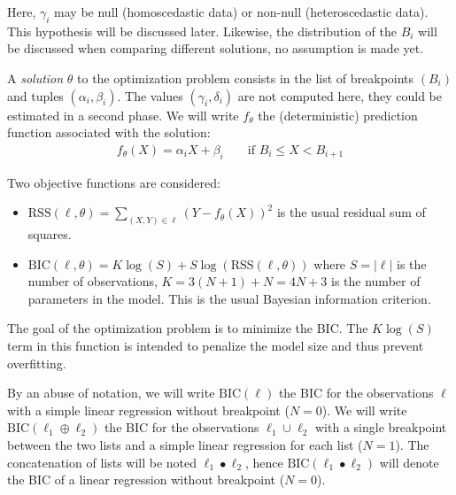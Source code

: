                 Here, \(\gamma_i\) may be null (homoscedastic data) or non-null (heteroscedastic data). This hypothesis
                will be discussed later. Likewise, the distribution of the \(B_i\) will be discussed when comparing
                different solutions, no assumption is made yet.

                A \emph{solution} \(\theta\) to the optimization problem consists in the list of breakpoints \((B_i)\)
                and tuples \((\alpha_i,\beta_i)\). The values \((\gamma_i, \delta_i)\) are not computed here, they could
                be estimated in a second phase. We will write \(f_\theta\) the (deterministic) prediction function
                associated with the solution:
                \begin{align}
                    f_{\theta}(X) = \alpha_i X + \beta_i
                        && \text{ if } B_i \leq X < B_{i+1}
                \end{align}

                Two objective functions are considered:
                \begin{itemize}
                    \item \(\text{RSS}(\ell, \theta) = \sum_{(X,Y)\in\ell} (Y-f_\theta(X))^2\) is the usual residual sum
                        of squares.
                    \item \(\text{BIC}(\ell, \theta) = K\log(S) + S\log(\text{RSS}(\ell, \theta))\) where \(S=|\ell|\)
                        is the number of observations, \(K = 3(N+1)+N = 4N+3\) is the number of parameters in the
                        model. This is the usual Bayesian information criterion.
                \end{itemize}

                The goal of the optimization problem is to minimize the BIC. The \(K\log(S)\) term in this function is
                intended to penalize the model size and thus prevent overfitting.

                By an abuse of notation, we will write \(\text{BIC}(\ell)\) the BIC for the observations \(\ell\) with a
                simple linear regression without breakpoint (\ie \(N=0\)). We will write
                \(\text{BIC}(\ell_1\oplus\ell_2)\) the BIC for the observations \(\ell_1 \cup \ell_2\) with a single
                breakpoint between the two lists and a simple linear regression for each list (\ie \(N=1\)).
                The concatenation of lists will be noted \(\ell_1 \bullet \ell_2\), hence
                \(\text{BIC}(\ell_1\bullet\ell_2)\) will denote the BIC of a linear regression without breakpoint
                (\(N=0\)).

